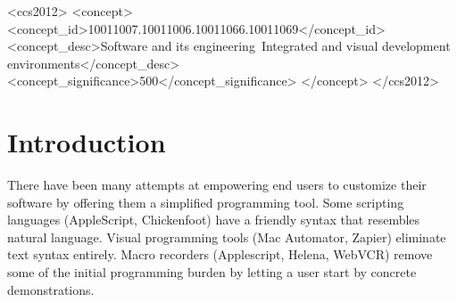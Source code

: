 \documentclass[sigplan,10pt,anonymous,review]{acmart}
\begin{document}
\begin{CCSXML}
<ccs2012>
<concept>
<concept_id>10011007.10011006.10011066.10011069</concept_id>
<concept_desc>Software and its engineering~Integrated and visual development environments</concept_desc>
<concept_significance>500</concept_significance>
</concept>
</ccs2012>
\end{CCSXML}




\maketitle

\hypertarget{introduction}{%
\section{Introduction}\label{introduction}}

There have been many attempts at empowering end users to customize their
software by offering them a simplified programming tool. Some scripting
languages (AppleScript, Chickenfoot) have a friendly syntax that
resembles natural language. Visual programming tools (Mac Automator,
Zapier) eliminate text syntax entirely. Macro recorders (Applescript,
Helena, WebVCR) remove some of the initial programming burden by letting
a user start by concrete demonstrations.
\end{document}
